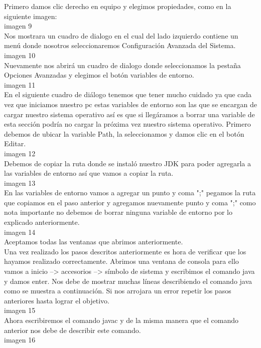 Primero damos clic derecho en equipo y elegimos propiedades, como en la siguiente imagen:\\
	imagen 9\\
Nos mostrara un cuadro de dialogo en el cual del lado izquierdo contiene un menú donde nosotros seleccionaremos Configuración Avanzada del Sistema.\\
	imagen 10\\
Nuevamente nos abrirá un cuadro de dialogo donde seleccionamos la pestaña Opciones Avanzadas y elegimos el botón variables de entorno.\\
	imagen 11\\
En el siguiente cuadro de diálogo tenemos que tener mucho cuidado ya que cada vez que iniciamos nuestro pc estas variables de entorno son las que se encargan de cargar nuestro sistema operativo así es que si llegáramos a borrar una variable de esta sección podría no cargar la próxima vez nuestro sistema operativo.
Primero debemos de ubicar la variable Path, la seleccionamos y damos clic en el botón Editar.\\
	imagen 12\\
Debemos de copiar la ruta donde se instaló nuestro JDK para poder agregarla a las variables de entorno así que vamos a copiar la ruta.\\
	imagen 13\\
En las variables de entorno vamos a agregar un punto y coma ";" pegamos la ruta que copiamos en el paso anterior y agregamos nuevamente punto y coma ";" como nota importante no debemos de borrar ninguna variable de entorno por lo explicado anteriormente.\\
	imagen 14\\
Aceptamos todas las ventanas que abrimos anteriormente.\\
Una vez realizado los pasos descritos anteriormente es hora de verificar que los hayamos realizado correctamente.
Abrimos una ventana de consola para ello vamos a inicio --> accesorios --> símbolo de sistema y escribimos el comando java y damos enter. Nos debe de mostrar muchas líneas describiendo el comando java como se muestra a continuación. Si nos arrojara un error repetir los pasos anteriores hasta lograr el objetivo.\\
	imagen 15\\
Ahora escribiremos el comando javac y de la misma manera que el comando anterior nos debe de describir este comando.\\
	imagen 16\\

